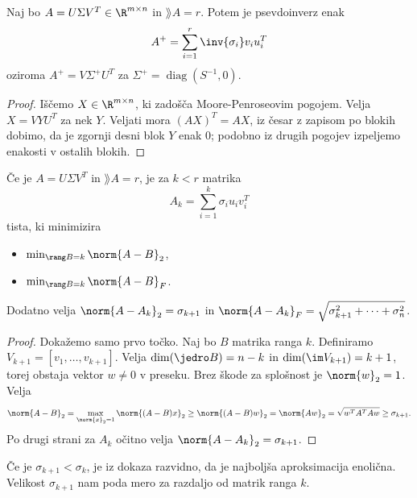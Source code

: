 
\begin{izrek}
  Naj bo $A = U \Sigma V^T \in \R^{m \times n}$ in $\rang A = r$.
  Potem je psevdoinverz enak
  \[
	A^+ = \sum_{i=1}^r \inv{\sigma_i} v_i u_i^T
  \]
  oziroma $A^+ = V \Sigma^+ U^T$ za $\Sigma^+ = \operatorname{diag}(S^{-1}, 0)$.
\end{izrek}

\begin{proof}
  Iščemo $X \in \R^{m \times n}$, ki zadošča Moore-Penroseovim pogojem.
  Velja $X = V Y U^T$ za nek $Y$.
  Veljati mora $(AX)^T = AX$, iz česar z zapisom po blokih dobimo, da je zgornji
  desni blok $Y$ enak $0$; podobno iz drugih pogojev izpeljemo enakosti v
  ostalih blokih.
\end{proof}



\begin{izrek}
  Če je $A = U \Sigma V^T$ in $\rang A = r$, je za $k < r$ matrika
  \[
	A_k = \sum_{i=1}^k \sigma_i u_i v_i^T
  \]
  tista, ki minimizira
  \begin{itemize}
  \item $\min_{\rang B = k} \norm{A - B}_2$,
  \item $\min_{\rang B = k} \norm{A - B}_F$.
  \end{itemize}
  Dodatno velja $\norm{A - A_k}_2 = \sigma_{k+1}$ in $\norm{A - A_k}_F =
  \sqrt{\sigma_{k+1}^2 + \cdots + \sigma_n^2}$.
\end{izrek}

\begin{proof}
  Dokažemo samo prvo točko.
  Naj bo $B$ matrika ranga $k$.
  Definiramo $V_{k+1} = [v_1, \ldots, v_{k+1}]$.
  Velja $\dim(\jedro B) = n-k$ in $\dim(\im V_{k+1}) = k+1$, torej obstaja
  vektor $w \ne 0$ v preseku.
  Brez škode za splošnost je $\norm{w}_2 = 1$.
  Velja
  \[
	\norm{A-B}_2 = \max_{\norm{x}_2 = 1} \norm{(A-B)x}_2
	\ge \norm{(A-B)w}_2 = \norm{Aw}_2 = \sqrt{w^T A^T A w} \ge \sigma_{k+1}.
  \]
  Po drugi strani za $A_k$ očitno velja $\norm{A - A_k}_2 = \sigma_{k+1}$.
\end{proof}


Če je $\sigma_{k+1} < \sigma_k$, je iz dokaza razvidno, da je najboljša
aproksimacija enolična.
Velikost $\sigma_{k+1}$ nam poda mero za razdaljo od matrik ranga $k$.

